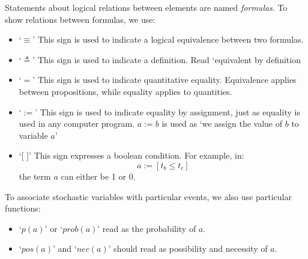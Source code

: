 \documentclass[
		twoside,openright,titlepage,numbers=noenddot,manychapters,
		headinclude,%
                footinclude=false,cleardoublepage=empty,
                BCOR=5mm,
		fontsize=11pt, %
                 enabledeprecatedfontcommands]{scrreprt}
\begin{document}
Statements about logical relations between elements are named \emph{formulas}. To  show relations between formulas, we use:
\begin{itemize}
  \item `$ \equiv$' This sign is used to indicate a logical equivalence between two formulas. %
  \item `$ \triangleq$'  This sign is used to indicate a definition. Read `equivalent by definition
  \item `$ = $' This sign is used to indicate quantitative equality. Equivalence applies between propositions, while equality applies to quantities.
  \item `$ :=  $' This sign is used to indicate equality by assignment, just as equality is used in any computer program. $a := b$ is used as `we assign the value of $b$ to variable $a$'
  \item `[ ]' This sign expresses a boolean condition. For example, in:
\begin{equation*}
 a :=[ t_b \leq t_c ]
\end{equation*} the term $a$ can either be 1 or 0.
\end{itemize}





To associate stochastic variables with particular events, we also use particular functions:
\begin{itemize}
  \item `$p(a)$' or `$prob(a)$' read as the probability of $a$.
  \item `$pos(a)$' and `$nec(a)$' should read as possibility and necessity of $a$.
\end{itemize}
\end{document}
